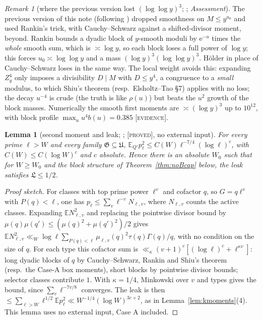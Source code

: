 \documentclass[10pt,reqno]{amsart}
\newtheorem{lemma}[theorem]{Lemma}
\theoremstyle{definition}
\theoremstyle{remark}
\newtheorem{remark}[theorem]{Remark}
\newcommand{\cG}{\mathfrak G}
\newcommand{\E}{\mathbb E}
\newcommand{\e}{\mathrm e}
\newcommand{\lab}[1]{\textup{[\textsc{#1}]}}
\begin{document}
\begin{remark}[where the previous version lost $(\log\log y)^3$; {\cite[\S1]{KA3}}; \emph{Assessment}]\label{rem:rankinloss}
The previous version of this note (following \cite[\S3]{KA2}) dropped
smoothness on $M\leq y^{u_0}$ and used Rankin's trick, with Cauchy--Schwarz
against a shifted-divisor moment, beyond.  Rankin bounds a dyadic block of
$y$-smooth moduli by $\e^{-u}$ times the \emph{whole} smooth sum, which is
$\asymp\log y$, so each block loses a full power of $\log y$; this forces
$u_0\asymp\log\log y$ and a mass $(\log y)^3(\log\log y)^3$.  H\"older in place of
Cauchy--Schwarz loses in the same way.  The local weight avoids this:
expanding $Z_y^4$ only imposes a divisibility $D\mid M$ with $D\leq y^4$, a
congruence to a \emph{small} modulus, to which Shiu's theorem
(resp.\ Elsholtz--Tao \S7) applies with no loss; the decay $u^{-4}$ is crude
(the truth is like $\rho(u)$) but beats the $u^2$ growth of the block masses.
Numerically the smooth first moments are $\asymp(\log y)^3$ up to $10^{12}$,
with block profile $\max_uu^4b(u)=0.385$ \cite[\S8]{KA3} \lab{evidence}.
\end{remark}

\begin{lemma}[second moment and leak; {\cite[Lemmas~4.1--4.3]{KA2}}; \lab{proved}, no external input]\label{lem:secondnoB}
For every prime $\ell>W$ and every family $\cG\subseteq\mathfrak U$,
$\E_{Q'}p_\ell^2\leq C(W)\ell^{-7/4}(\log\ell)^c$, with $C(W)\leq C(\log W)^c$
and $c$ absolute.  Hence there is an absolute $W_0$ such that for
$W\geq W_0$ and the block structure of Theorem~\ref{thm:noBcap} below, the
leak satisfies $\mathfrak L\leq1/2$.
\end{lemma}
\begin{proof}[Proof sketch]
For classes with top prime power $\ell^v$ and cofactor $q$, so $G=q\ell^v$
with $P(q)<\ell$, one has $p_\ell\leq\sum_v\ell^{-v}N_{\ell,v}$, where
$N_{\ell,v}$ counts the active classes.  Expanding $\E N_{\ell,v}^2$ and
replacing the pointwise divisor bound by
$\mu(q)\mu(q')\leq(\mu(q)^2+\mu(q')^2)/2$ gives
$\E N_{\ell,v}^2\ll_W\log\ell\sum_{P(q)<\ell}\mu_{\ell,v}(q)^2\tau(q)\Gamma(q)/q$, with no
condition on the size of $q$.  For each type this cofactor sum is
$\ll_\kappa(v+1)^c[(\log\ell)^c+\ell^{\kappa v}]$: long dyadic blocks of $q$ by
Cauchy--Schwarz, Rankin and Shiu's theorem (resp.\ the Case-A box
moments), short blocks by pointwise divisor bounds; selector classes
contribute $1$.  With $\kappa=1/4$, Minkowski over $v$ and types gives the
bound, since $\sum_v\ell^{-7v/8}$ converges.  The leak is then
$\leq\sum_{\ell>W}\ell^{1/2}\E p_\ell^2\ll W^{-1/4}(\log W)^{3c+2}$, as in
Lemma~\ref{lem:kmoments}(4).  This lemma uses no external input, Case A
included.
\end{proof}
\end{document}
